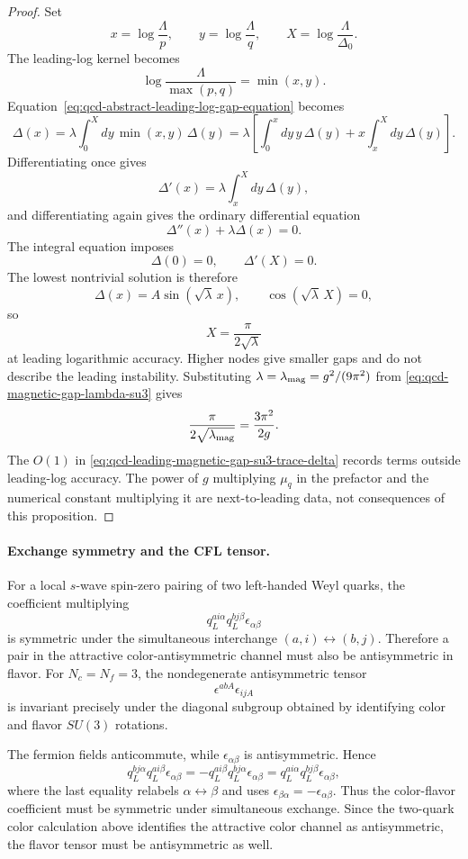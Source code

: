 \begin{proof}
Set
\[
  x=\log\frac{\Lambda}{p},
  \qquad
  y=\log\frac{\Lambda}{q},
  \qquad
  X=\log\frac{\Lambda}{\Delta_0}.
\]
The leading-log kernel becomes
\[
  \log\frac{\Lambda}{\max(p,q)}=\min(x,y).
\]
Equation~\eqref{eq:qcd-abstract-leading-log-gap-equation} becomes
\[
  \Delta(x)
  =
  \lambda
  \int_0^X dy\,\min(x,y)\,\Delta(y)
  =
  \lambda
  \left[
    \int_0^x dy\,y\,\Delta(y)
    +
    x\int_x^Xdy\,\Delta(y)
  \right].
\]
Differentiating once gives
\[
  \Delta'(x)=\lambda\int_x^Xdy\,\Delta(y),
\]
and differentiating again gives the ordinary differential equation
\[
  \Delta''(x)+\lambda\Delta(x)=0.
\]
The integral equation imposes
\[
  \Delta(0)=0,
  \qquad
  \Delta'(X)=0.
\]
The lowest nontrivial solution is therefore
\[
  \Delta(x)=A\sin(\sqrt{\lambda}\,x),
  \qquad
  \cos(\sqrt{\lambda}\,X)=0,
\]
so
\[
  X=\frac{\pi}{2\sqrt{\lambda}}
\]
at leading logarithmic accuracy.  Higher nodes give smaller gaps and do not
describe the leading instability.  Substituting
\(\lambda=\lambda_{\rm mag}=g^2/(9\pi^2)\) from
\eqref{eq:qcd-magnetic-gap-lambda-su3} gives
\[
  \frac{\pi}{2\sqrt{\lambda_{\rm mag}}}
  =
  \frac{3\pi^2}{2g}.
\]
The \(O(1)\) in \eqref{eq:qcd-leading-magnetic-gap-su3-trace-delta}
records terms outside leading-log accuracy.  The power of \(g\) multiplying
\(\mu_q\) in the prefactor and the numerical constant multiplying it are
next-to-leading data, not consequences of this proposition.
\end{proof}

\paragraph{Exchange symmetry and the CFL tensor.}
For a local \(s\)-wave spin-zero pairing of two left-handed Weyl quarks,
the coefficient multiplying
\[
  q^{a i\alpha}_L q^{b j\beta}_L\epsilon_{\alpha\beta}
\]
is symmetric under the simultaneous interchange
\((a,i)\leftrightarrow(b,j)\).  Therefore a pair in the attractive
color-antisymmetric channel must also be antisymmetric in flavor.  For
\(N_c=N_f=3\), the nondegenerate antisymmetric tensor
\[
  \epsilon^{abA}\epsilon_{ijA}
\]
is invariant precisely under the diagonal subgroup obtained by identifying
color and flavor \(SU(3)\) rotations.

The fermion fields anticommute, while
\(\epsilon_{\alpha\beta}\) is antisymmetric.  Hence
\[
  q^{b j\alpha}_L q^{a i\beta}_L\epsilon_{\alpha\beta}
  =
  -q^{a i\beta}_L q^{b j\alpha}_L\epsilon_{\alpha\beta}
  =
  q^{a i\alpha}_L q^{b j\beta}_L\epsilon_{\alpha\beta},
\]
where the last equality relabels \(\alpha\leftrightarrow\beta\) and uses
\(\epsilon_{\beta\alpha}=-\epsilon_{\alpha\beta}\).  Thus the color-flavor
coefficient must be symmetric under simultaneous exchange.  Since the
two-quark color calculation above identifies the attractive color channel as
antisymmetric, the flavor tensor must be antisymmetric as well.


